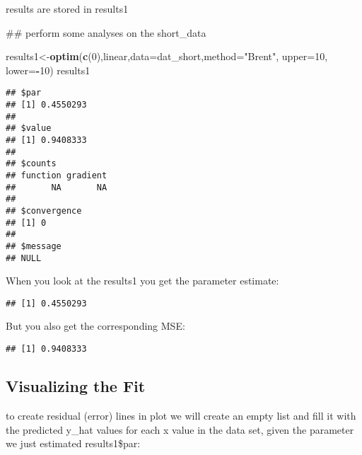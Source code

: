 \documentclass[]{article}
\newenvironment{Shaded}{\begin{snugshade}}{\end{snugshade}}
\newcommand{\KeywordTok}[1]{\textcolor[rgb]{0.13,0.29,0.53}{\textbf{#1}}}
\newcommand{\DataTypeTok}[1]{\textcolor[rgb]{0.13,0.29,0.53}{#1}}
\newcommand{\DecValTok}[1]{\textcolor[rgb]{0.00,0.00,0.81}{#1}}
\newcommand{\StringTok}[1]{\textcolor[rgb]{0.31,0.60,0.02}{#1}}
\newcommand{\OperatorTok}[1]{\textcolor[rgb]{0.81,0.36,0.00}{\textbf{#1}}}
\newcommand{\NormalTok}[1]{#1}
\begin{document}
results are stored in results1

\begin{Shaded}
\begin{Highlighting}[]
\NormalTok{## perform some analyses on the short_data}

\NormalTok{results1<-}\KeywordTok{optim}\NormalTok{(}\KeywordTok{c}\NormalTok{(}\DecValTok{0}\NormalTok{),linear,}\DataTypeTok{data=}\NormalTok{dat_short,}\DataTypeTok{method=}\StringTok{"Brent"}\NormalTok{, }\DataTypeTok{upper=}\DecValTok{10}\NormalTok{, }\DataTypeTok{lower=}\OperatorTok{-}\DecValTok{10}\NormalTok{)}
\NormalTok{results1}
\end{Highlighting}
\end{Shaded}

\begin{verbatim}
## $par
## [1] 0.4550293
## 
## $value
## [1] 0.9408333
## 
## $counts
## function gradient 
##       NA       NA 
## 
## $convergence
## [1] 0
## 
## $message
## NULL
\end{verbatim}

When you look at the results1 you get the parameter estimate:

\begin{Shaded}
\end{Shaded}

\begin{verbatim}
## [1] 0.4550293
\end{verbatim}

But you also get the corresponding MSE:

\begin{Shaded}
\end{Shaded}

\begin{verbatim}
## [1] 0.9408333
\end{verbatim}

\subsection{Visualizing the Fit}\label{visualizing-the-fit}

to create residual (error) lines in plot we will create an empty list
and fill it with the predicted y\_hat values for each x value in the
data set, given the parameter we just estimated results1\$par:
\end{document}
